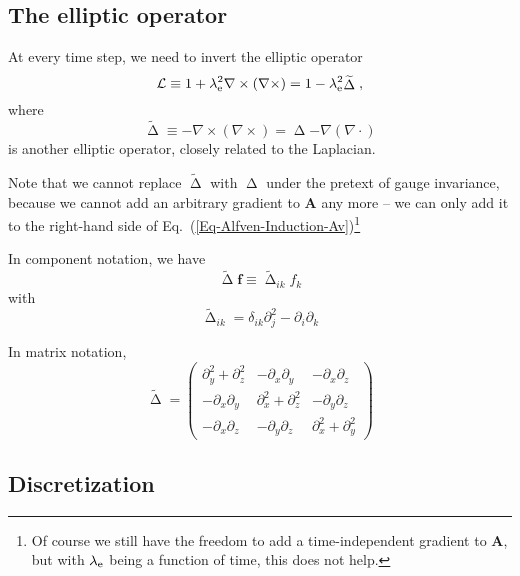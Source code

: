 \documentclass[\mydriver,12pt,twoside,notitlepage,letterpaper]{article}
\newcommand{\Av}      {\mathbf{A}}
\newcommand{\fv}      {\mathbf{f}}
\newcommand{\Laplace} { \mathop{\Delta}\nolimits}
\begin{document}
\subsection{The elliptic operator}

At every time step, we need to invert the elliptic operator
\begin{equation}
  \mathcal{L}
  \equiv 1 +\lambda_{\rm e}^2 \nabla\times (\nabla\times)
  = 1 - \lambda_{\rm e}^2 \widetilde{\Laplace} \; ,
\end{equation}
where
\begin{equation}
   \widetilde{\Laplace}
   \equiv -\nabla\times (\nabla\times)
   = \Laplace - \nabla (\nabla \cdot)
\end{equation}
is another elliptic operator, closely related to the Laplacian.

Note that we cannot replace $\widetilde{\Laplace}$ with $\Laplace$ under
the pretext of gauge invariance, because we cannot add an arbitrary
gradient to $\Av$ any more -- we can only add it to the right-hand side of
Eq.~(\ref{Eq-Alfven-Induction-Av})\footnote{Of course we still have the
  freedom to add a time-independent gradient to $\Av$, but with
  $\lambda_{\rm e}$ being a function of time, this does not help.}

In component notation, we have
\begin{equation}
  \widetilde{\Laplace} \fv
  \equiv \widetilde{\Laplace}_{ik} f_k
\end{equation}
with
\begin{equation}
  \widetilde{\Laplace}_{ik} = \delta_{ik} \partial_j^2
  - \partial_i \partial_k
\end{equation}

In matrix notation,
\begin{equation}
  \widetilde{\Laplace}
  =
  \begin{pmatrix}
    \partial_y^2{+}\partial_z^2 & -\partial_x \partial_y      & -\partial_x \partial_z \\
    -\partial_x \partial_y      & \partial_x^2{+}\partial_z^2 & -\partial_y \partial_z \\
    -\partial_x \partial_z      & -\partial_y \partial_z      & \partial_x^2{+}\partial_y^2
  \end{pmatrix}
\end{equation}


\subsection{Discretization}
\end{document}
